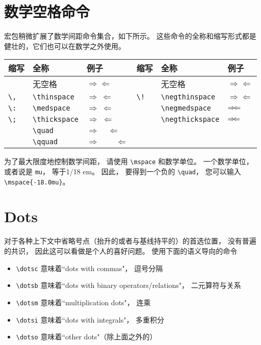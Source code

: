 \section{数学空格命令}
宏包稍微扩展了数学间距命令集合，如下所示。 这些命令的全称和缩写形式都是健壮的，它们也可以在数学之外使用。
\begin{center}
\begin{tabular}{p{}p{}p{}|p{}
p{}p{}}
缩写                &全称                 &例子             &缩写              &全称               &例子\\
\hline
          &无空格              &$\Rightarrow\Leftarrow$ &  &无空格&$\Rightarrow\Leftarrow$ \\
\verb|\,| &\verb|\thinspace|&$\Rightarrow\,\Leftarrow$ &\verb|\!|&\verb|\negthinspace|&$\Rightarrow\!\Leftarrow$\\
\verb|\:|&\verb|\medspace|&$\Rightarrow\:\Leftarrow$&  &\verb|\negmedspace|&$\Rightarrow\negmedspace\Leftarrow$\\
\verb|\;|&\verb|\thickspace|&$\Rightarrow\;\Leftarrow$&  &\verb|\negthickspace|&$\Rightarrow\negthickspace\Leftarrow$\\
&\verb|\quad|&$\Rightarrow\quad\Leftarrow$&&&\\
&\verb|\qquad|&$\Rightarrow\qquad\Leftarrow$&&&
\end{tabular}
\end{center}

为了最大限度地控制数学间距，  请使用 \verb|\mspace| 和数学单位。 一个数学单位，  或者说是 \verb|mu|，  等于1/18 em。 因此，  要得到一个负的 \verb|\quad|，  您可以输入 \verb|\mspace{-18.0mu}|。
\section{Dots}
对于各种上下文中省略号点（抬升的或者与基线持平的）的首选位置，  没有普遍的共识，  因此这可以看做是个人的喜好问题。 使用下面的语义导向的命令
\begin{itemize}
  \item \verb|\dotsc| 意味着``dots with commas"，  逗号分隔
  \item \verb|\dotsb| 意味着``dots with binary operators/relations"，  二元算符与关系
  \item \verb|\dotsm| 意味着``multiplication dots"，  连乘
  \item \verb|\dotsi| 意味着``dots with integrals"，  多重积分
  \item \verb|\dotso| 意味着``other dots"（除上面之外的）
\end{itemize}

